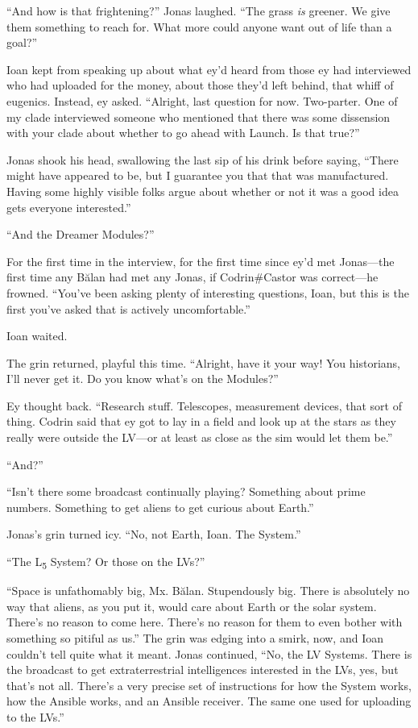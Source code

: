 ``And how is that frightening?'' Jonas laughed. ``The grass \emph{is} greener. We give them something to reach for. What more could anyone want out of life than a goal?''

Ioan kept from speaking up about what ey'd heard from those ey had interviewed who had uploaded for the money, about those they'd left behind, that whiff of eugenics. Instead, ey asked. ``Alright, last question for now. Two-parter. One of my clade interviewed someone who mentioned that there was some dissension with your clade about whether to go ahead with Launch. Is that true?''

Jonas shook his head, swallowing the last sip of his drink before saying, ``There might have appeared to be, but I guarantee you that that was manufactured. Having some highly visible folks argue about whether or not it was a good idea gets everyone interested.''

``And the Dreamer Modules?''

For the first time in the interview, for the first time since ey'd met Jonas---the first time any Bălan had met any Jonas, if Codrin\#Castor was correct---he frowned. ``You've been asking plenty of interesting questions, Ioan, but this is the first you've asked that is actively uncomfortable.''

Ioan waited.

The grin returned, playful this time. ``Alright, have it your way! You historians, I'll never get it. Do you know what's on the Modules?''

Ey thought back. ``Research stuff. Telescopes, measurement devices, that sort of thing. Codrin said that ey got to lay in a field and look up at the stars as they really were outside the LV---or at least as close as the sim would let them be.''

``And?''

``Isn't there some broadcast continually playing? Something about prime numbers. Something to get aliens to get curious about Earth.''

Jonas's grin turned icy. ``No, not Earth, Ioan. The System.''

``The L\textsubscript{5} System? Or those on the LVs?''

``Space is unfathomably big, Mx. Bălan. Stupendously big. There is absolutely no way that aliens, as you put it, would care about Earth or the solar system. There's no reason to come here. There's no reason for them to even bother with something so pitiful as us.'' The grin was edging into a smirk, now, and Ioan couldn't tell quite what it meant. Jonas continued, ``No, the LV Systems. There is the broadcast to get extraterrestrial intelligences interested in the LVs, yes, but that's not all. There's a very precise set of instructions for how the System works, how the Ansible works, and an Ansible receiver. The same one used for uploading to the LVs.''

